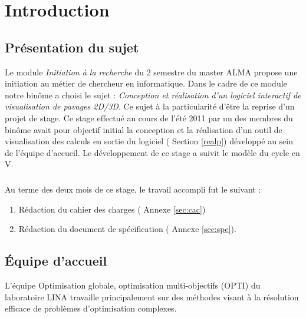 \chapter{Introduction}

\section{Présentation du sujet}
Le module \emph{Initiation à la recherche} du 2 semestre du master \textsc{ALMA} propose une initiation au métier de chercheur en informatique. Dans le cadre de ce module notre binôme a choisi le sujet : \emph{Conception et réalisation d’un logiciel interactif de visualisation de pavages 2D/3D}. Ce sujet à la particularité d'être la reprise d'un projet de stage. Ce stage effectué au cours de l'été 2011 par un des membres du binôme avait pour objectif initial la conception et la réalisation d'un outil de visualisation des calculs en sortie du logiciel \realpaver (\cf{} Section \ref{realp}) développé au sein de l'équipe d'accueil. Le développement de ce stage a suivit le modèle du cycle en V.

\paragraph{}
Au terme des deux mois de ce stage, le travail accompli fut le suivant :
\begin{enumerate}
\item 
Rédaction du cahier des charges (\cf{} Annexe \ref{sec:cac})
\item
Rédaction du document de spécification (\cf{} Annexe \ref{sec:spe}).
\end{enumerate} 



\section{Équipe d'accueil}
L'équipe Optimisation globale, optimisation multi-objectifs\cite{opti} (\textsc{OPTI}) du laboratoire \textsc{LINA}\cite{lina} travaille principalement sur des méthodes visant à la résolution efficace de problèmes d’optimisation complexes.  

